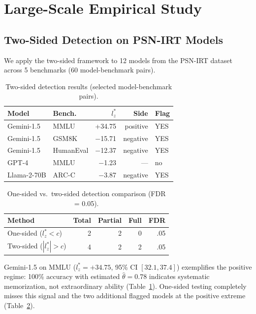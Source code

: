 \documentclass[11pt,a4paper]{article}
\begin{document}
\section{Large-Scale Empirical Study}
\label{sec:empirical}

\subsection{Two-Sided Detection on PSN-IRT Models}
\label{sec:two-sided}

We apply the two-sided framework to 12 models from the PSN-IRT dataset across 5 benchmarks (60 model-benchmark pairs).

\begin{table}[t]
\centering
\caption{Two-sided detection results (selected model-benchmark pairs).}
\label{tab:two-sided-results}
\small
\begin{tabular}{llrrl}
\toprule
\textbf{Model} & \textbf{Bench.} & $l_z^*$ & \textbf{Side} & \textbf{Flag} \\
\midrule
Gemini-1.5 & MMLU & +34.75 & positive & YES \\
Gemini-1.5 & GSM8K & $-$15.71 & negative & YES \\
Gemini-1.5 & HumanEval & $-$12.37 & negative & YES \\
GPT-4 & MMLU & $-$1.23 & --- & no \\
Llama-2-70B & ARC-C & $-$3.87 & negative & YES \\
\bottomrule
\end{tabular}
\end{table}

\begin{table}[t]
\centering
\caption{One-sided vs.\ two-sided detection comparison (FDR = 0.05).}
\label{tab:one-vs-two}
\small
\begin{tabular}{lrrrr}
\toprule
\textbf{Method} & \textbf{Total} & \textbf{Partial} & \textbf{Full} & \textbf{FDR} \\
\midrule
One-sided ($l_z^* < c$) & 2 & 2 & 0 & .05 \\
Two-sided ($|l_z^*| > c$) & 4 & 2 & 2 & .05 \\
\bottomrule
\end{tabular}
\end{table}

Gemini-1.5 on MMLU ($l_z^*=+34.75$, 95\% CI $[32.1, 37.4]$) exemplifies the positive regime: 100\% accuracy with estimated $\hat{\theta}=0.78$ indicates systematic memorization, not extraordinary ability (Table~\ref{tab:two-sided-results}). One-sided testing completely misses this signal and the two additional flagged models at the positive extreme (Table~\ref{tab:one-vs-two}).
\end{document}

